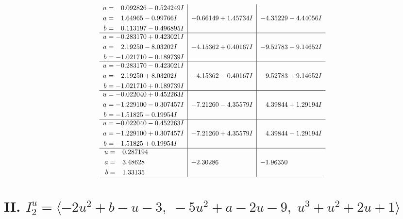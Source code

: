 \documentclass[1p]{elsarticle_modified}
\theoremstyle{definition}
\begin{document}
$$\begin{array}{c|c|c}
\begin{aligned}
u &= \phantom{-}0.092826 - 0.524249 I \\
a &= \phantom{-}1.64965 - 0.99766 I \\
b &= \phantom{-}0.113197 - 0.496895 I\end{aligned}
 & -0.66149 + 1.45734 I & -4.35229 - 4.44056 I \\ \hline\begin{aligned}
u &= -0.283170 + 0.423021 I \\
a &= \phantom{-}2.19250 - 8.03202 I \\
b &= -1.021710 - 0.189739 I\end{aligned}
 & -4.15362 + 0.40167 I & -9.52783 - 9.14652 I \\ \hline\begin{aligned}
u &= -0.283170 - 0.423021 I \\
a &= \phantom{-}2.19250 + 8.03202 I \\
b &= -1.021710 + 0.189739 I\end{aligned}
 & -4.15362 - 0.40167 I & -9.52783 + 9.14652 I \\ \hline\begin{aligned}
u &= -0.022040 + 0.452263 I \\
a &= -1.229100 - 0.307457 I \\
b &= -1.51825 - 0.19954 I\end{aligned}
 & -7.21260 - 4.35579 I & \phantom{-}4.39844 + 1.29194 I \\ \hline\begin{aligned}
u &= -0.022040 - 0.452263 I \\
a &= -1.229100 + 0.307457 I \\
b &= -1.51825 + 0.19954 I\end{aligned}
 & -7.21260 + 4.35579 I & \phantom{-}4.39844 - 1.29194 I \\ \hline\begin{aligned}
u &= \phantom{-}0.287194\phantom{ +0.000000I} \\
a &= \phantom{-}3.48628\phantom{ +0.000000I} \\
b &= \phantom{-}1.33135\phantom{ +0.000000I}\end{aligned}
 & -2.30286\phantom{ +0.000000I} & -1.96350\phantom{ +0.000000I}\\
 \hline 
 \end{array}$$\newpage\newpage\renewcommand{\arraystretch}{1}
\centering \section*{II. $I^u_{2}= \langle -2 u^2+b- u-3,\;-5 u^2+a-2 u-9,\;u^3+u^2+2 u+1 \rangle$}
\end{document}
